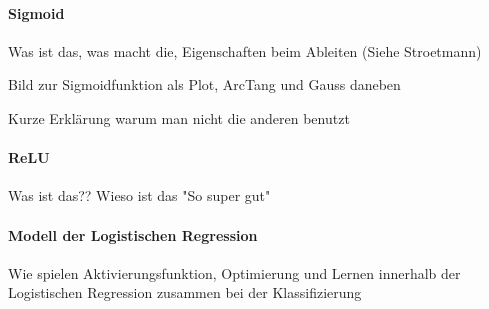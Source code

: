 \paragraph{Sigmoid}
Was ist das, was macht die, Eigenschaften beim Ableiten (Siehe Stroetmann)

Bild zur Sigmoidfunktion als Plot, ArcTang und Gauss daneben

Kurze Erklärung warum man nicht die anderen benutzt
\paragraph{ReLU}
Was ist das?? Wieso ist das "So super gut"
\paragraph{Modell der Logistischen Regression}
Wie spielen Aktivierungsfunktion, Optimierung und Lernen innerhalb der Logistischen Regression zusammen bei der Klassifizierung
